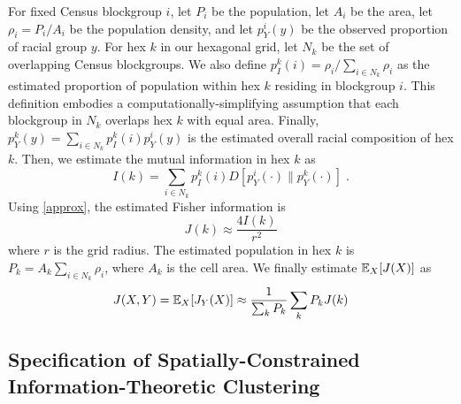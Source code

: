 	For fixed Census blockgroup $i$, let $P_i$ be the population, let $A_i$ be the area, let $\rho_i = P_i / A_i$ be the population density, and let $p^i_Y(y)$ be the observed proportion of racial group $y$. For hex $k$ in our hexagonal grid, let $N_k$ be the set of overlapping Census blockgroups. We also define $p^{k}_I(i) = \rho_i / \sum_{i \in N_k} \rho_i$ as the estimated proportion of population within hex $k$ residing in blockgroup $i$. This definition embodies a computationally-simplifying assumption that each blockgroup in $N_k$ overlaps hex $k$ with equal area. Finally, $p^k_Y(y) = \sum_{i \in N_k} p^{k}_I(i) p^i_Y(y)$ is the estimated overall racial composition of hex $k$. Then, we estimate the mutual information in hex $k$ as 
	\begin{equation}
		I(k) = \sum_{i \in N_k} p^k_I(i) D[p^i_Y(\cdot) \| p^k_Y(\cdot)]\;. 
	\end{equation}
	Using \eqref{approx}, the estimated Fisher information is 
	\begin{equation}
		J(k) \approx \frac{4 I(k)}{r^2}
	\end{equation}
	where $r$ is the grid radius. The estimated population in hex $k$ is $P_k = A_k\sum_{i \in N_k} \rho_i$, where $A_k$ is the cell area. We finally estimate $\mathbb{E}_X[J(X)]$ as 
	\begin{equation}
		J(X,Y) = \mathbb{E}_X[J_Y(X)] \approx \frac{1}{\sum_k P_k} \sum_k P_k J(k)
	\end{equation}


\subsection{Specification of Spatially-Constrained Information-Theoretic Clustering}
